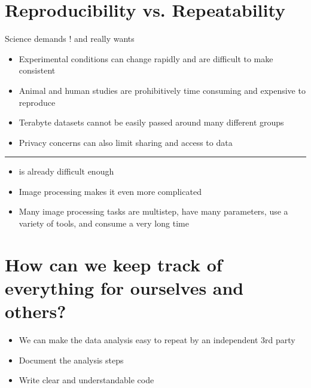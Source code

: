 \documentclass[letterpaper,10pt,english]{sphinxmanual}
\begin{document}
\section{Reproducibility vs. Repeatability}
\label{\detokenize{01-Introduction:id5}}
\sphinxAtStartPar
Science demands ! and really wants 
\begin{itemize}
\item {} 
\sphinxAtStartPar
Experimental conditions can change rapidly and are difficult to make consistent

\item {} 
\sphinxAtStartPar
Animal and human studies are prohibitively time consuming and expensive to reproduce

\item {} 
\sphinxAtStartPar
Terabyte datasets cannot be easily passed around many different groups

\item {} 
\sphinxAtStartPar
Privacy concerns can also limit sharing and access to data

\end{itemize}


\bigskip\hrule\bigskip

\begin{itemize}
\item {} 
\sphinxAtStartPar
{} is already difficult enough

\item {} 
\sphinxAtStartPar
Image processing makes it even more complicated

\item {} 
\sphinxAtStartPar
Many image processing tasks are multistep, have many parameters, use a variety of tools, and consume a very long time

\end{itemize}


\section{How can we keep track of everything for ourselves and others?}
\label{\detokenize{01-Introduction:how-can-we-keep-track-of-everything-for-ourselves-and-others}}\begin{itemize}
\item {} 
\sphinxAtStartPar
We can make the data analysis easy to repeat by an independent 3rd party

\item {} 
\sphinxAtStartPar
Document the analysis steps

\item {} 
\sphinxAtStartPar
Write clear and understandable code

\end{itemize}
\end{document}
